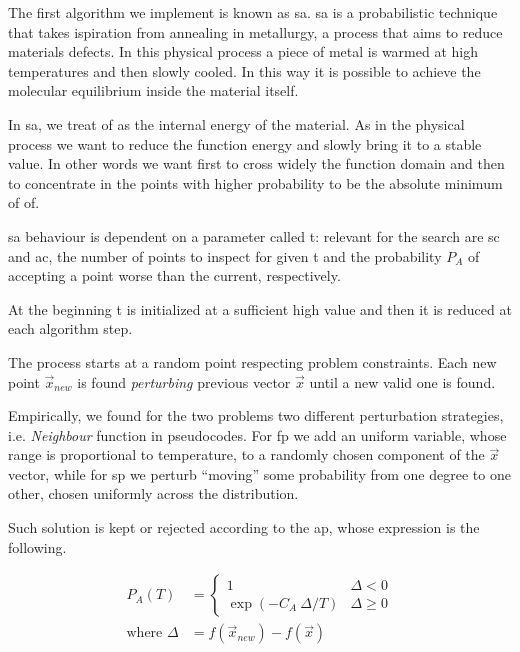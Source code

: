 \documentclass[journal]{IEEEtran}
\begin{document}
The first algorithm we implement is known as \gls{sa}.
\gls{sa} is a probabilistic technique that takes ispiration from annealing in metallurgy, a process that aims to reduce materials defects.
In this physical process a piece of metal is warmed at high temperatures and then slowly cooled. In this way it is possible to achieve the molecular equilibrium inside the material itself.

In \gls{sa}, we treat \gls{of} as the internal energy of the material.
As in the physical process we want to reduce the function energy and slowly bring it to a stable value. In other words we want first to cross widely the function domain and then to concentrate in the points with higher probability to be the absolute minimum of \gls{of}.

\gls{sa} behaviour is dependent on a parameter called \gls{t}: relevant for the search are \gls{sc} and \gls{ac}, the number of points to inspect for given \gls{t} and the probability $P_A$ of accepting a point worse than the current, respectively.

At the beginning \gls{t} is initialized at a sufficient high value and then it is reduced at each algorithm step.

The process starts at a random point respecting problem constraints. Each new point $\vec{x}_{new}$ is found \emph{perturbing} previous vector $\vec{x}$ until a new valid one is found.

Empirically, we found for the two problems two different perturbation strategies, i.e. \emph{Neighbour} function in pseudocodes.
For \gls{fp} we add an uniform variable, whose range is proportional to temperature, to a randomly chosen component of the $\vec{x}$ vector, while for \gls{sp} we perturb ``moving'' some probability from one degree to one other, chosen uniformly across the distribution.

Such solution is kept or rejected according to the \gls{ap}, whose expression is the following.

\begin{equation*} \label{accept_prob}
	\begin{split}
	P_A(T) &= \begin{cases}
		1 & \Delta < 0 \\
		\exp{ \left( - C_A ~ \Delta / T \right) }
		& \Delta \geq 0
	\end{cases} \\
	\text{where } \Delta &= f(\vec{x}_{new})-f (\vec{x})
	\end{split}
\end{equation*}
\end{document}
